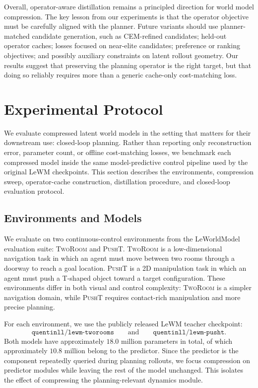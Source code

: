 \documentclass[11pt]{article}
\begin{document}
Overall, operator-aware distillation remains a principled direction for world model compression. The key lesson from our experiments is that the operator objective must be carefully aligned with the planner. Future variants should use planner-matched candidate generation, such as CEM-refined candidates; held-out operator caches; losses focused on near-elite candidates; preference or ranking objectives; and possibly auxiliary constraints on latent rollout geometry. Our results suggest that preserving the planning operator is the right target, but that doing so reliably requires more than a generic cache-only cost-matching loss.

\section{Experimental Protocol}
\label{sec:experimental_protocol}

We evaluate compressed latent world models in the setting that matters for their downstream use: closed-loop planning. Rather than reporting only reconstruction error, parameter count, or offline cost-matching losses, we benchmark each compressed model inside the same model-predictive control pipeline used by the original LeWM checkpoints. This section describes the environments, compression sweep, operator-cache construction, distillation procedure, and closed-loop evaluation protocol.

\subsection{Environments and Models}
\label{sec:envs_models}

We evaluate on two continuous-control environments from the LeWorldModel evaluation suite: \textsc{TwoRoom} and \textsc{PushT}. \textsc{TwoRoom} is a low-dimensional navigation task in which an agent must move between two rooms through a doorway to reach a goal location. \textsc{PushT} is a 2D manipulation task in which an agent must push a T-shaped object toward a target configuration. These environments differ in both visual and control complexity: \textsc{TwoRoom} is a simpler navigation domain, while \textsc{PushT} requires contact-rich manipulation and more precise planning.

For each environment, we use the publicly released LeWM teacher checkpoint:
\[
    \texttt{quentinll/lewm-tworooms}
    \qquad\text{and}\qquad
    \texttt{quentinll/lewm-pusht}.
\]
Both models have approximately \(18.0\) million parameters in total, of which approximately \(10.8\) million belong to the predictor. Since the predictor is the component repeatedly queried during planning rollouts, we focus compression on predictor modules while leaving the rest of the model unchanged. This isolates the effect of compressing the planning-relevant dynamics module.
\end{document}
